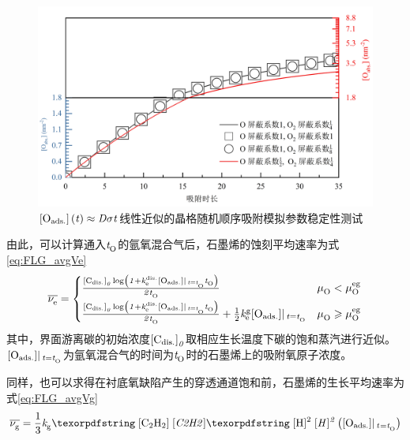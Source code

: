 \begin{figure}[htb]
    \includegraphics{pic/FLG_RSA_OabsorbPera.png}
    \caption{$\rm{\left[O_{ads.}\right]} \it\left(\it t\right)\approx \it D \sigma t$线性近似的晶格随机顺序吸附模拟参数稳定性测试}
    \label{fig:FLG_RSA_OabsorbPera}
\end{figure}

由此，可以计算通入$\it{t_{\rm O}^{\rm }} \it$的氩氧混合气后，石墨烯的蚀刻平均速率为式\eqref{eq:FLG_avgVe}\chinesecolon
\begin{equation}
    \label{eq:FLG_avgVe}
    \overline{\it \nu_{\rm e}^{\rm } \it}=
    \begin{cases}
        \frac{\rm{\left[C_{dis.}\right]} \it_0 \log\left( 1+\it{k_{\rm e}^{\rm dis.}} \it\rm{\left[O_{ads.}\right]} \it | \,_{t=\it{t_{\rm O}^{\rm }} \it} \it{t_{\rm O}^{\rm }} \it \right) }{\it 2 \it{t_{\rm O}^{\rm }} \it}                                                        & \it \mu_{\rm O}^{\rm } \it <  \it \mu_{\rm O}^{\rm eg} \it         \\[+1ex]
        \frac{\rm{\left[C_{dis.}\right]} \it_0 \log\left( 1+\it{k_{\rm e}^{\rm dis.}} \it\rm{\left[O_{ads.}\right]} \it | \,_{t=\it{t_{\rm O}^{\rm }} \it} \it{t_{\rm O}^{\rm }} \it \right) }{\it 2 \it{t_{\rm O}^{\rm }} \it} + \frac{1}{2}\it{k_{\rm e}^{\rm g}} \it\rm{\left[O_{ads.}\right]} \it| \,_{t=\it{t_{\rm O}^{\rm }} \it} & \it \mu_{\rm O}^{\rm } \it \geqslant \it \mu_{\rm O}^{\rm eg} \it
    \end{cases}
\end{equation}
其中，界面游离碳的初始浓度$\rm{\left[C_{dis.}\right]} \it_0$取相应生长温度下碳的饱和蒸汽进行近似。$\rm{\left[O_{ads.}\right]} \it| \,_{t=\it{t_{\rm O}^{\rm }} \it}$为氩氧混合气的时间为$\it{t_{\rm O}^{\rm }} \it$时的石墨烯上的吸附氧原子浓度。

同样，也可以求得在衬底氧缺陷产生的穿透通道饱和前，石墨烯的生长平均速率为式\eqref{eq:FLG_avgVg}\chinesecolon
\begin{equation}
    \label{eq:FLG_avgVg}
    \overline{\RateV{g}{}} =\frac{1}{3}\RateK{g}{}\cemb{[C2H2]}\cemb{[H]^2}\left(\Oads |_{\,\ReactTime{}{}=\ReactTime{O}{}} \right)
\end{equation}

